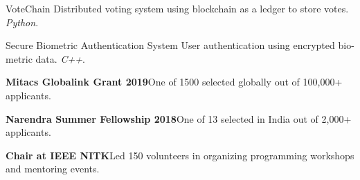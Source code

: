 \documentclass[10pt,a4paper]{article}
\begin{document}
\headedsectiontwo
{VoteChain}{}{}
{
	Distributed voting system using blockchain as a ledger to store votes. \textit{Python}.
}

\headedsectiontwo
{Secure Biometric Authentication System}{}{}
{
	User authentication using encrypted bio-metric data. \textit{C++}.
}


\begin{circlist}
	\item \textbf{Mitacs Globalink Grant 2019}\hspace{0.5em}One of 1500 selected globally out of 100,000+ applicants.
	\item \textbf{Narendra Summer Fellowship 2018}\hspace{0.5em}One of 13 selected in India out of 2,000+ applicants.
	\item \textbf{Chair at IEEE NITK}\hspace{0.5em}Led 150 volunteers in organizing programming workshops and mentoring events.
\end{circlist}

\end{document}
